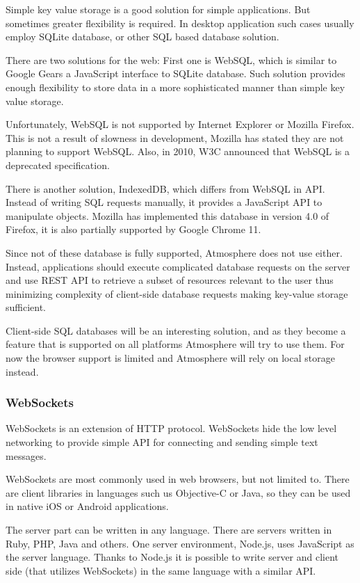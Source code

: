 Simple key value storage is a good solution for simple applications. But sometimes greater flexibility is required. In desktop application such cases usually employ SQLite database, or other SQL based database solution. 

There are two solutions for the web: First one is WebSQL, which is similar to Google Gears a JavaScript interface to SQLite database. Such solution provides enough flexibility to store data in a more sophisticated manner than simple key value storage.

Unfortunately, WebSQL is not supported by Internet Explorer or Mozilla Firefox. This is not a result of slowness in development, Mozilla has stated they are not planning to support WebSQL. \citep{mozilla_indexeddb} Also, in 2010, W3C announced that WebSQL is a deprecated specification. \citep{w3c_webdatabase}

There is another solution, IndexedDB, which differs from WebSQL in API. Instead of writing SQL requests manually, it provides a JavaScript API to manipulate objects. Mozilla has implemented this database in version 4.0 of Firefox, it is also partially supported by Google Chrome 11.

Since not of these database is fully supported, Atmosphere does not use either. Instead, applications should execute complicated database requests on the server and use REST API to retrieve a subset of resources relevant to the user thus minimizing complexity of client-side database requests making key-value storage sufficient.

Client-side SQL databases will be an interesting solution, and as they become a feature that is supported on all platforms Atmosphere will try to use them. For now the browser support is limited and Atmosphere will rely on local storage instead.

\subsubsection{WebSockets}

WebSockets is an extension of HTTP protocol. WebSockets hide the low level networking to provide simple API for connecting and sending simple text messages. 

WebSockets are most commonly used in web browsers, but not limited to. There are client libraries in languages such us Objective-C or Java, so they can be used in native iOS or Android applications.

The server part can be written in any language. There are servers written in Ruby, PHP, Java and others. One server environment, Node.js, uses JavaScript as the server language. Thanks to Node.js it is possible to write server and client side (that utilizes WebSockets) in the same language with a similar API.

